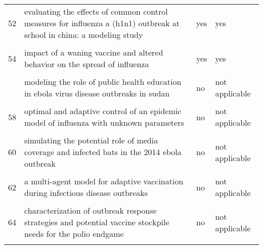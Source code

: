 \documentclass[
]{article}
\begin{document}
\begin{landscape}
\begin{longtable}{l>{\raggedright\arraybackslash}p{4cm}l>{\raggedright\arraybackslash}p{4cm}}
52 & evaluating the effects of common control measures for influenza a (h1n1) outbreak at school in china: a modeling study & yes & yes\\
\cellcolor{gray!6}{53} & \cellcolor{gray!6}{evaluation of strategies to control a potential outbreak of foot-and-mouth disease in sweden} & \cellcolor{gray!6}{yes} & \cellcolor{gray!6}{no}\\
54 & impact of a waning vaccine and altered behavior on the spread of influenza & yes & yes\\
\cellcolor{gray!6}{55} & \cellcolor{gray!6}{mathematical models for devising the optimal ebola virus disease eradication} & \cellcolor{gray!6}{no} & \cellcolor{gray!6}{not applicable}\\
\addlinespace
56 & modeling the role of public health education in ebola virus disease outbreaks in sudan & no & not applicable\\
\cellcolor{gray!6}{57} & \cellcolor{gray!6}{modelling the transmission and control strategies of varicella among school children in shenzhen, china} & \cellcolor{gray!6}{no} & \cellcolor{gray!6}{not applicable}\\
58 & optimal and adaptive control of an epidemic model of influenza with unknown parameters & no & not applicable\\
\cellcolor{gray!6}{59} & \cellcolor{gray!6}{simulating endogenous dynamics of intervention-capacity deployment: ebola outbreak in liberia} & \cellcolor{gray!6}{no} & \cellcolor{gray!6}{not applicable}\\
60 & simulating the potential role of media coverage and infected bats in the 2014 ebola outbreak & no & not applicable\\
\addlinespace
\cellcolor{gray!6}{61} & \cellcolor{gray!6}{a mathematical model of ebola virus disease: using sensitivity analysis to determine effective intervention targets} & \cellcolor{gray!6}{no} & \cellcolor{gray!6}{not applicable}\\
62 & a multi-agent model for adaptive vaccination during infectious disease outbreaks & no & not applicable\\
\cellcolor{gray!6}{63} & \cellcolor{gray!6}{assessing the efficiency of movement restriction as a control strategy of ebola} & \cellcolor{gray!6}{no} & \cellcolor{gray!6}{not applicable}\\
64 & characterization of outbreak response strategies and potential vaccine stockpile needs for the polio endgame & no & not applicable\\
\cellcolor{gray!6}{65} & \cellcolor{gray!6}{designing public health policies to mitigate the adverse consequences of rural-urban migration via meta-population modeling} & \cellcolor{gray!6}{no} & \cellcolor{gray!6}{not applicable}\\

\end{longtable}
\end{landscape}
\end{document}
